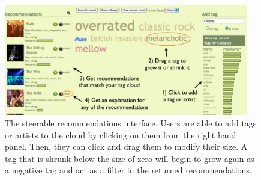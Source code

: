 \documentclass[a4paper,10pt,twocolumn]{article}
\begin{document}
\begin{figure}
\begin{center}
\includegraphics[width=0.95\textwidth]{steerable-withtxt}
\end{center}
\caption{The steerable recommendations interface. Users are able to add tags or artists to the cloud by clicking on them from the right hand panel. Then, they can click and drag them to modify their size. A tag that is shrunk below the size of zero will begin to grow again as a negative tag and act as a filter in the returned recommendations.}
\label{fig:steerable}
\end{figure}
\end{document}

